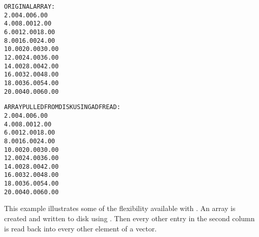 \begin{alltt}
   ORIGINAL ARRAY:
             2.00           4.00           6.00
             4.00           8.00          12.00
             6.00          12.00          18.00
             8.00          16.00          24.00
            10.00          20.00          30.00
            12.00          24.00          36.00
            14.00          28.00          42.00
            16.00          32.00          48.00
            18.00          36.00          54.00
            20.00          40.00          60.00

   ARRAY PULLED FROM DISK USING ADFREAD:
             2.00           4.00           6.00
             4.00           8.00          12.00
             6.00          12.00          18.00
             8.00          16.00          24.00
            10.00          20.00          30.00
            12.00          24.00          36.00
            14.00          28.00          42.00
            16.00          32.00          48.00
            18.00          36.00          54.00
            20.00          40.00          60.00
\end{alltt}


This example illustrates some of the flexibility available with
.
An array is created and written to disk using
\hyperlink{sub:Write\_All\_Data}{}.
Then every other entry in the second column is read back into every
other element of a vector.

